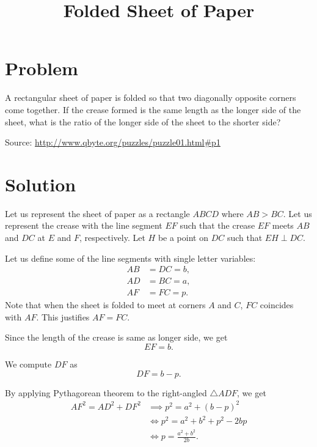 \documentclass{article}
\title{Folded Sheet of Paper}
\begin{document}
\maketitle

\section*{Problem}
A rectangular sheet of paper is folded so that two diagonally opposite
corners come together. If the crease formed is the same length as the
longer side of the sheet, what is the ratio of the longer side of the
sheet to the shorter side?

Source: \url{http://www.qbyte.org/puzzles/puzzle01.html#p1}

\section*{Solution}
Let us represent the sheet of paper as a rectangle \( ABCD \) where
\( AB > BC \). Let us represent the crease with the line segment
\( EF \) such that the crease \( EF \) meets \( AB \) and \( DC \) at
\( E \) and \( F \), respectively. Let \( H \) be a point on \( DC \)
such that \( EH \perp DC \).



Let us define some of the line segments with single letter variables:
\begin{align*}
AB & = DC = b, \\
AD & = BC = a, \\
AF & = FC = p.
\end{align*}
Note that when the sheet is folded to meet at corners \( A \) and
\( C \), \( FC \) coincides with \( AF \). This justifies \( AF = FC \).

Since the length of the crease is same as longer side, we get
\[
EF = b.
\]

We compute \( DF \) as
\begin{equation}
\label{df}
DF = b - p.
\end{equation}

By applying Pythagorean theorem to the right-angled \( \triangle ADF \),
we get
\begin{align*}
AF^2 = AD^2 + DF^2
& \implies p^2  = a^2 + (b - p)^2 \\
& \iff     p^2  = a^2 + b^2 + p^2 - 2bp \\
& \iff     p    = \frac{a^2 + b^2}{2b}.
\end{align*}
\end{document}
